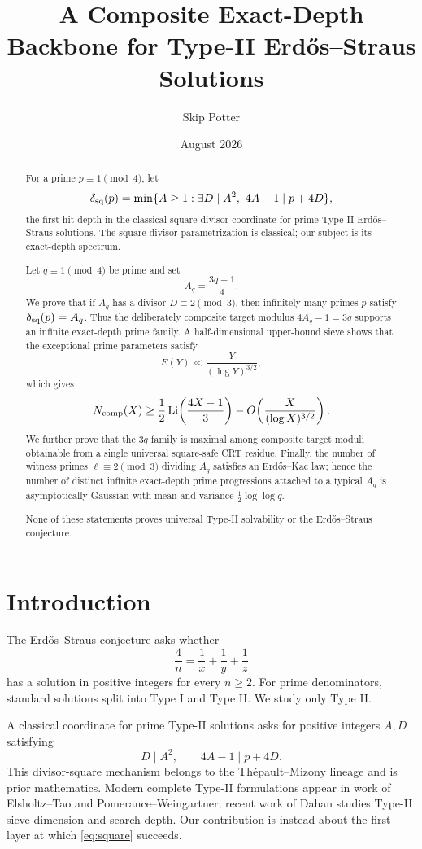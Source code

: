 \documentclass[11pt]{article}
\title{A Composite Exact-Depth Backbone for Type-II Erd\H{o}s--Straus Solutions}
\author{Skip Potter}
\date{August 2026}
\theoremstyle{definition}
\newcommand{\sqdepth}{\delta_{\rm sq}}
\begin{document}
\maketitle

\begin{abstract}
For a prime $p\equiv1\pmod4$, let
\[
\sqdepth(p)=\min\{A\ge1:\exists D\mid A^2,\ 4A-1\mid p+4D\},
\]
the first-hit depth in the classical square-divisor coordinate for prime Type-II Erd\H{o}s--Straus solutions. The square-divisor parametrization is classical; our subject is its exact-depth spectrum.

Let $q\equiv1\pmod4$ be prime and set
\[
A_q=\frac{3q+1}{4}.
\]
We prove that if $A_q$ has a divisor $D\equiv2\pmod3$, then infinitely many primes $p$ satisfy $\sqdepth(p)=A_q$. Thus the deliberately composite target modulus $4A_q-1=3q$ supports an infinite exact-depth prime family. A half-dimensional upper-bound sieve shows that the exceptional prime parameters satisfy
\[
E(Y)\ll \frac{Y}{(\log Y)^{3/2}},
\]
which gives
\[
N_{\rm comp}(X)\ge \frac12\operatorname{Li}\!\left(\frac{4X-1}{3}\right)
-O\!\left(\frac{X}{(\log X)^{3/2}}\right).
\]
We further prove that the $3q$ family is maximal among composite target moduli obtainable from a single universal square-safe CRT residue. Finally, the number of witness primes $\ell\equiv2\pmod3$ dividing $A_q$ satisfies an Erd\H{o}s--Kac law; hence the number of distinct infinite exact-depth prime progressions attached to a typical $A_q$ is asymptotically Gaussian with mean and variance $\frac12\log\log q$.

None of these statements proves universal Type-II solvability or the Erd\H{o}s--Straus conjecture.
\end{abstract}

\section{Introduction}
The Erd\H{o}s--Straus conjecture asks whether
\[
\frac4n=\frac1x+\frac1y+\frac1z
\]
has a solution in positive integers for every $n\ge2$. For prime denominators, standard solutions split into Type I and Type II. We study only Type II.

A classical coordinate for prime Type-II solutions asks for positive integers $A,D$ satisfying
\begin{equation}\label{eq:square}
D\mid A^2,\qquad 4A-1\mid p+4D.
\end{equation}
This divisor-square mechanism belongs to the Th\'epault--Mizony lineage and is prior mathematics. Modern complete Type-II formulations appear in work of Elsholtz--Tao and Pomerance--Weingartner; recent work of Dahan studies Type-II sieve dimension and search depth. Our contribution is instead about the first layer at which \eqref{eq:square} succeeds.
\end{document}
